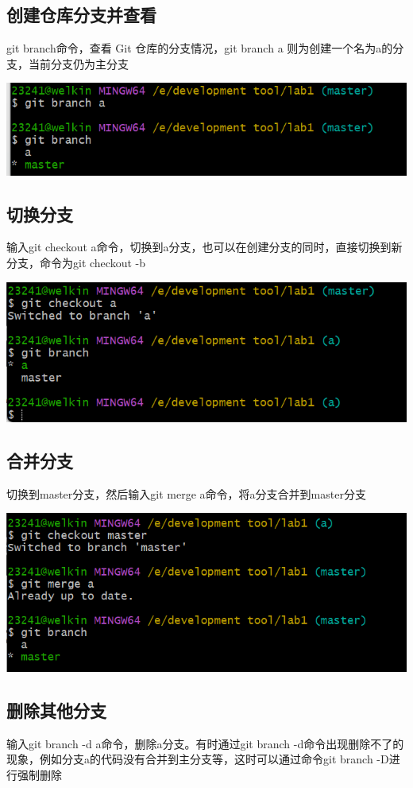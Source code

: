 \documentclass[UTF8,a4paper]{ctexart}
\begin{document}
\begin{sloppypar}
	\subsection{创建仓库分支并查看}
	git branch命令，查看 Git 仓库的分支情况，git branch a 则为创建一个名为a的分支，当前分支仍为主分支
	
	\includegraphics[width = 16cm]{6}
	
	\subsection{切换分支}
	输入git checkout a命令，切换到a分支，也可以在创建分支的同时，直接切换到新分支，命令为git checkout -b
	
	\includegraphics[width = 16cm]{7}
	
	\subsection{合并分支}
	切换到master分支，然后输入git merge a命令，将a分支合并到master分支
	
	\includegraphics[width = 16cm]{8}
	
	\subsection{删除其他分支}
	输入git branch -d a命令，删除a分支。有时通过git branch -d命令出现删除不了的现象，例如分支a的代码没有合并到主分支等，这时可以通过命令git branch -D进行强制删除
	

\end{sloppypar}
\end{document}
